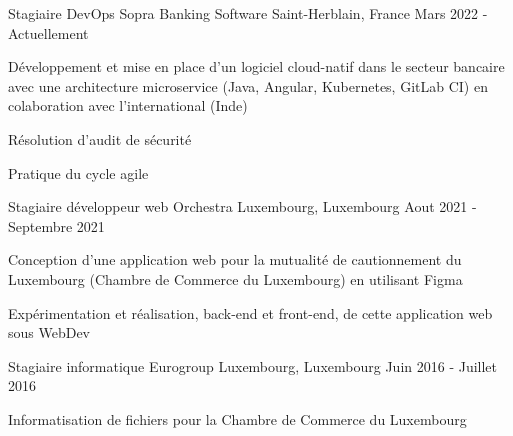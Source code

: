 
\begin{cventries}
  \cventry
    {Stagiaire DevOps} %
    {Sopra Banking Software} %
    {Saint-Herblain, France} %
    {Mars 2022 - Actuellement} %
    {
      \begin{cvitems} %
        \item {Développement et mise en place d'un logiciel cloud-natif dans le secteur bancaire avec une architecture microservice (Java, Angular, Kubernetes, GitLab CI) en colaboration avec l'international (Inde)}
        \item {Résolution d'audit de sécurité}
        \item {Pratique du cycle agile}
      \end{cvitems}
    }
    
  \cventry
    {Stagiaire développeur web} %
    {Orchestra} %
    {Luxembourg, Luxembourg} %
    {Aout 2021 - Septembre 2021} %
    {
      \begin{cvitems} %
        \item {Conception d'une application web pour la mutualité de cautionnement du Luxembourg (Chambre de Commerce du Luxembourg) en utilisant Figma}
        \item {Expérimentation et réalisation, back-end et front-end, de cette application web sous WebDev}
      \end{cvitems}
    }

  \cventry
    {Stagiaire informatique} %
    {Eurogroup} %
    {Luxembourg, Luxembourg} %
    {Juin 2016 - Juillet 2016} %
    {
      \begin{cvitems} %
        \item {Informatisation de fichiers pour la Chambre de Commerce du Luxembourg}
      \end{cvitems}
    }

\end{cventries}
